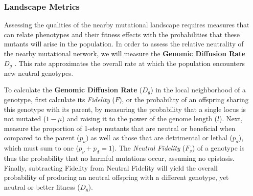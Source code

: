 \documentclass[letterpaper]{article}
\begin{document}
\subsubsection{Landscape Metrics} 
Assessing the qualities of the nearby mutational landscape requires measures that can relate phenotypes and their fitness effects with the probabilities that these mutants will arise in the population. In order to assess the relative neutrality of the nearby mutational network, we will measure the \textbf{Genomic Diffusion Rate} $D_g$ \cite{ofria_evolution_2002}. This rate approximates the overall rate at which the population encounters new neutral genotypes.
% 
% 

% 
% 

To calculate the \textbf{Genomic Diffusion Rate} ($D_g$) in the local neighborhood of a genotype, first calculate its \textit{Fidelity} ($F$), or the probability of an offspring sharing this genotype with its parent, by measuring the probability that a single locus is not mutated ($1-\mu)$ and raising it to the power of the genome length ($l$). Next, measure the proportion of 1-step mutants that are neutral or beneficial when compared to the parent ($p_\nu$) as well as those that are detrimental or lethal ($p_d$), which must sum to one ($p_\nu + p_d = 1$).  The \textit{Neutral Fidelity} ($F_\nu$) of a genotype is thus the probability that no harmful mutations occur, assuming no epistasis. Finally, subtracting Fidelity from Neutral Fidelity will yield the overall probability of producing an neutral offspring with a different genotype, yet neutral or better fitness ($D_g$). 
\end{document}
